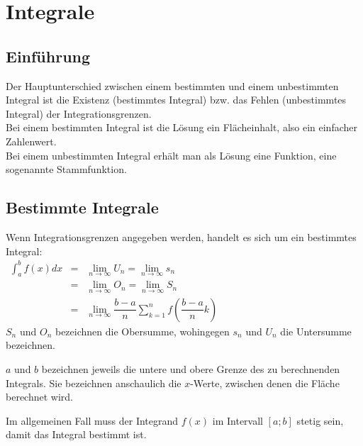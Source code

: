 \chapter{Integrale}
\section{Einführung}
Der Hauptunterschied zwischen einem bestimmten und einem unbestimmten Integral ist die Existenz (bestimmtes Integral) bzw. das Fehlen
(unbestimmtes Integral) der Integrationsgrenzen.\\
Bei einem bestimmten Integral ist die Lösung ein Flächeinhalt, also ein einfacher Zahlenwert.\\
Bei einem unbestimmten Integral erhält man als Lösung eine Funktion, eine sogenannte Stammfunktion.\\


\section{Bestimmte Integrale}
\begin{Definition}
  Wenn Integrationsgrenzen angegeben werden, handelt es sich um ein bestimmtes Integral:\\
  $
  \begin{array}{rcl}
    \int_{a}^{b} f(x)dx     & = & \lim\limits_{n \rightarrow \infty} U_n = \lim\limits_{n \rightarrow \infty} s_n\\
                            & = & \lim\limits_{n \rightarrow \infty} O_n = \lim\limits_{n \rightarrow \infty} S_n\\
                            & = & \lim\limits_{n \rightarrow \infty} \dfrac{b-a}{n}\sum\limits_{k=1}^{n}f(\dfrac{b-a}{n}k)

  \end{array}
  $\\
  $S_n$ und $O_n$ bezeichnen die Obersumme, wohingegen $s_n$ und $U_n$ die Untersumme bezeichnen.
\end{Definition}
\begin{Bemerkung}
  $a$ und $b$ bezeichnen jeweils die untere und obere Grenze des zu berechnenden Integrals. Sie bezeichnen anschaulich die $x$-Werte, zwischen denen die Fläche berechnet wird.
\end{Bemerkung}
\begin{Bemerkung}
  Im allgemeinen Fall muss der Integrand $f(x)$ im Intervall $[a;b]$ stetig sein, damit das Integral bestimmt ist.
\end{Bemerkung}

